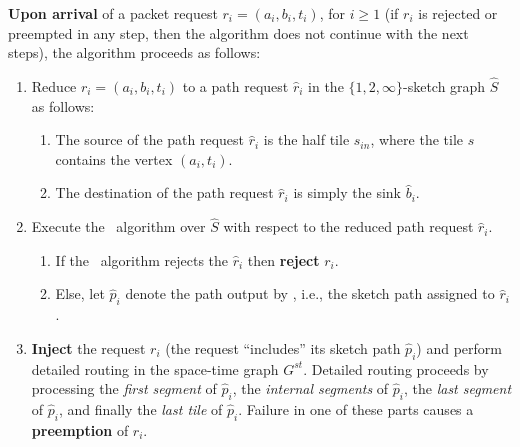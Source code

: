 \documentclass[11pt]{article}
\newcommand{\route}{\text{\sc{ipp}}}
\newcommand{\IPP}{\route}
\newenvironment{proof sketch}[1]{\noindent {\emph{Proof sketch of #1:}}}{\hfill \qed}
\begin{document}
\begin{algorithm}[H]
    \textbf{Upon arrival} of a packet request $r_i = (a_i,b_i,t_i)$, for $i\geq 1$ (if $r_i$ is rejected or preempted in any step, then the algorithm does not continue with the next steps), the algorithm proceeds as follows:
        \begin{enumerate}
            \item \label{item:reduce}Reduce $r_i = (a_i,b_i,t_i)$ to a path request $\hat r_i$ in the $\{1,2,\infty\}$-sketch graph $\hat S$ as follows:
                \begin{enumerate}
                  \item The source of the path request $\hat r_i$ is the half  tile $s_{in}$, where the tile $s$ contains the vertex $(a_i,t_i)$.
                  \item The destination of the path request $\hat r_i$ is simply the sink $\hat b_i$.
                \end{enumerate}
            \item Execute the \IPP\ algorithm over $\hat S$ with respect to the reduced path request $\hat r_i$.
             \begin{enumerate}
               \item If the \IPP\ algorithm rejects the $\hat r_i$ then \textbf{reject} $r_i$.
               \item Else, let $\hat p_i$ denote the path output by \IPP, i.e., the sketch path assigned to $\hat r_i$.
             \end{enumerate}
            \item \label{item:I} \textbf{Inject} the request $r_i$ (the request ``includes'' its sketch path  $\hat p_i$) and perform detailed routing in the space-time graph $G^{st}$.
                Detailed routing proceeds by processing the \emph{first segment} of $\hat p_i$, the \emph{internal segments} of $\hat p_i$, the \emph{last segment} of $\hat p_i$, and finally the \emph{last tile} of $\hat p_i$.
                Failure in one of these parts causes a \textbf{preemption} of $r_i$.
\begin{comment}
                  \begin{enumerate}
                  \item Perform detailed routing in the \emph{first segment} of $\hat p_i$. If the detailed routing in this segment fails then \textbf{preempt} $r_i$.
                  \item Perform detailed routing in the \emph{internal segments} of $\hat p_i$ (this part of detailed routing always succeeds).

\end{comment}
\end{enumerate}
\end{algorithm}
\end{document}
